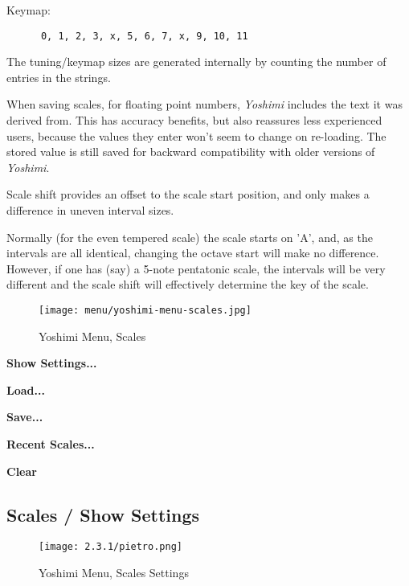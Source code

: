    Keymap:

   \begin{verbatim}
      0, 1, 2, 3, x, 5, 6, 7, x, 9, 10, 11
   \end{verbatim}

   The tuning/keymap sizes are generated internally by counting the number of
   entries in the strings.

   When saving scales, for floating point numbers, \textsl{Yoshimi} includes
   the text it was derived from. This has accuracy benefits,
   but also reassures less experienced users,
   because the values they enter won't seem to change on
   re-loading.  The stored value is still saved for backward compatibility with
   older versions of \textsl{Yoshimi}.

   Scale shift provides an offset to the scale start position, and only makes a
   difference in uneven interval sizes.

   Normally (for the even tempered scale) the scale starts on 'A', and, as the
   intervals are all identical, changing the octave start will make no
   difference. However, if one has (say) a 5-note pentatonic scale, the
   intervals will be very different and the scale shift will effectively
   determine the key of the scale.

\begin{figure}[H]
   \centering
   \texttt{[image: menu/yoshimi-menu-scales.jpg]}
   \caption{Yoshimi Menu, Scales}
   \label{fig:yoshimi_scales}
\end{figure}

   \begin{enumber}
      \item \textbf{Show Settings...}
      \item \textbf{Load...}
      \item \textbf{Save...}
      \item \textbf{Recent Scales...}
      \item \textbf{Clear}
   \end{enumber}

\subsection{Scales / Show Settings}
\label{subsec:scales_show}

\begin{figure}[H]
   \centering
   \texttt{[image: 2.3.1/pietro.png]}
   \caption{Yoshimi Menu, Scales Settings}
   \label{fig:yoshimi_scales_settings}
\end{figure}


